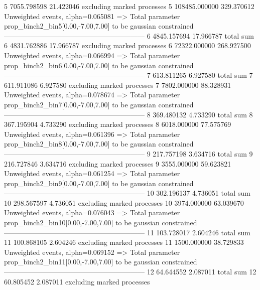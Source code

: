 5          7055.798598     21.422046       excluding marked processes    
5          108485.000000   329.370612      Unweighted events, alpha=0.065081
  => Total parameter prop_binch2_bin5[0.00,-7.00,7.00] to be gaussian constrained
------------------------------------------------------------
6          4845.157694     17.966787       total sum                     
6          4831.762886     17.966787       excluding marked processes    
6          72322.000000    268.927500      Unweighted events, alpha=0.066994
  => Total parameter prop_binch2_bin6[0.00,-7.00,7.00] to be gaussian constrained
------------------------------------------------------------
7          613.811265      6.927580        total sum                     
7          611.911086      6.927580        excluding marked processes    
7          7802.000000     88.328931       Unweighted events, alpha=0.078674
  => Total parameter prop_binch2_bin7[0.00,-7.00,7.00] to be gaussian constrained
------------------------------------------------------------
8          369.480132      4.733290        total sum                     
8          367.195904      4.733290        excluding marked processes    
8          6018.000000     77.575769       Unweighted events, alpha=0.061396
  => Total parameter prop_binch2_bin8[0.00,-7.00,7.00] to be gaussian constrained
------------------------------------------------------------
9          217.757198      3.634716        total sum                     
9          216.727846      3.634716        excluding marked processes    
9          3555.000000     59.623821       Unweighted events, alpha=0.061254
  => Total parameter prop_binch2_bin9[0.00,-7.00,7.00] to be gaussian constrained
------------------------------------------------------------
10         302.196137      4.736051        total sum                     
10         298.567597      4.736051        excluding marked processes    
10         3974.000000     63.039670       Unweighted events, alpha=0.076043
  => Total parameter prop_binch2_bin10[0.00,-7.00,7.00] to be gaussian constrained
------------------------------------------------------------
11         103.728017      2.604246        total sum                     
11         100.868105      2.604246        excluding marked processes    
11         1500.000000     38.729833       Unweighted events, alpha=0.069152
  => Total parameter prop_binch2_bin11[0.00,-7.00,7.00] to be gaussian constrained
------------------------------------------------------------
12         64.644552       2.087011        total sum                     
12         60.805452       2.087011        excluding marked processes    

